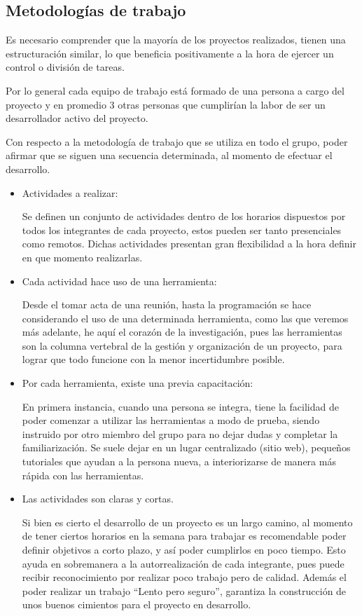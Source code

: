
\subsection{Metodologías de trabajo}

Es necesario comprender que la mayoría de los proyectos realizados,
tienen una estructuración similar, lo que beneficia positivamente a la hora
de ejercer un control o división de tareas.

Por lo general cada equipo de trabajo está formado de una persona
a cargo del proyecto y en promedio 3 otras personas que cumplirían
la labor de ser un desarrollador activo del proyecto.

Con respecto a la metodología de trabajo que se utiliza
en todo el grupo, poder afirmar que se siguen una secuencia determinada,
al momento de efectuar el desarrollo.

\begin{itemize}
    \item Actividades a realizar:

			Se definen un conjunto de actividades dentro de los horarios
			dispuestos por todos los integrantes de cada proyecto, estos
			pueden ser tanto presenciales como remotos. Dichas actividades
			presentan gran flexibilidad a la hora definir en que momento
			realizarlas.
    \item Cada actividad hace uso de una herramienta:

			Desde el tomar acta de una reunión, hasta la programación
			se hace considerando el uso de una determinada herramienta,
			como las que veremos más adelante, he aquí el corazón de la
			investigación, pues las herramientas son la columna vertebral
			de la gestión y organización de un proyecto, para lograr que 
			todo funcione con la menor incertidumbre posible.
    \item Por cada herramienta, existe una previa capacitación:

			En primera instancia, cuando una persona se integra,
			tiene la facilidad de poder comenzar a utilizar las herramientas
			a modo de prueba, siendo instruido por otro miembro del grupo
			para no dejar dudas y completar la familiarización. Se suele
			dejar en un lugar centralizado (sitio web), pequeños tutoriales
			que ayudan a la persona nueva, a interiorizarse de manera más
			rápida con las herramientas.
    \item Las actividades son claras y cortas.

			Si bien es cierto el desarrollo de un proyecto es un largo camino,
			al momento de tener ciertos horarios en la semana para trabajar
			es recomendable poder definir objetivos a corto plazo, y así
			poder cumplirlos en poco tiempo. Esto ayuda en sobremanera
			a la autorrealización de cada integrante, pues puede recibir
			reconocimiento por realizar poco trabajo pero de calidad.
			Además el poder realizar un trabajo ``Lento pero seguro'',
			garantiza la construcción de unos buenos cimientos para el
			proyecto en desarrollo.
\end{itemize}


